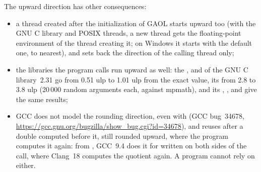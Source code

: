 \medskip
\noindent
The upward direction has other consequences:
\begin{itemize}
\item a thread created after the initialization of GAOL starts upward too
  (with the GNU C library and POSIX threads, a new thread gets the
  floating-point environment of the thread creating it; on Windows it starts
  with the default one, to nearest), and  sets back the direction of the
  calling thread only;
\item the libraries the program calls run upward as well: the ,
   and  of the GNU C library~2.31 go from 0.51 ulp to 1.01
  ulp from the exact value, its  from 2.8 to 3.8 ulp (20\,000
  random arguments each, against mpmath), and its , ,
   and  give the same results;
\item GCC does not model the rounding direction, even with
   (GCC bug~34678,
  \url{https://gcc.gnu.org/bugzilla/show_bug.cgi?id=34678}), and reuses after
   a double computed before it, still rounded upward, where
  the program computes it again: from , GCC~9.4 does it for
   written on both sides of the call, where Clang~18 computes the
  quotient again. A program cannot rely on either.
\end{itemize}

